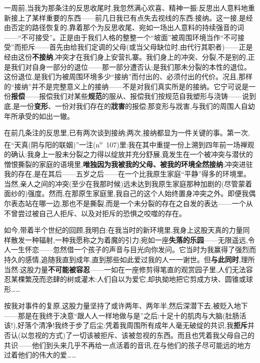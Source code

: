 一周前,当我为那条注的反思收尾时,我忽然满心欢喜、精神一振:反思出人意料地重新接上了某样重要的东西——前几日我已有点失去视线的东西:接纳。这一接,是经由否定的路径恢复的,靠着那个为反思收尾、宛如一场出人意料的持续强音的词——“不可接受”。正是由于我们人格的整整一个“坡面”被周围环境当作“不可接受”而拒斥——首先由给我们定调的父母(或当父母缺位时,由代行其职者)——正是经由这份\textbf{不接纳},冲突才在我们身上安营扎寨。我们身上的冲突、分裂,不是别的,正是我们对自身一部分的退位——那一部分遭否认;是我们那未分裂的本性的退位。这份退位,是我们为被周围环境多少“接纳”而付出的、必须付出的代价。况且,那样的“接纳”并不是完整意义上的接纳——不是对我们真实所是的接纳。它宁可说是一份\textbf{报偿}\dmark{}——报偿我们对某些\textbf{规范}的服从、报偿我们按规范自我塑形与浇铸——说到底,是一份\textbf{变形}、一份对我们存在的\textbf{戕害}的报偿;那变形与戕害,与我们的周围人自幼年所承受的如出一辙。

在前几条注的反思里,已有两次谈到接纳;两次,接纳都显为一件关键的事。第一次,在“天真(阴与阳的联姻)”一注(n\textsuperscript{o}~107)里:我在其中重提一份上溯到四年前一场禅观的确认:我身上一股未分裂之力得以绽放并充分舒展,竟发生在一个被冲突与潜伏的憎恨撕裂的家庭的语境里,\textbf{唯独因为我被我的父母、被我的环境全然接纳};冲突进驻我的存在,是在其后——五岁之后——在一个比我原生家庭“平静”得多的环境里。当然,亲人之间的冲突(至少在我那时候)远未达到我原生家庭那种加剧的(尽管蒙着面纱的)强度。然而,在那原生家庭里,我自己的这个人始终置身冲突之外。即便我偶尔表态站在哪一边,那也不是撕裂,而是一个未分裂的存在之自发的表达——一个从不曾尝过被自己人拒斥、以及对拒斥的恐惧之咬噬的存在。

如今,带着半个世纪的回顾,我明白:在我当时的新环境里,我身上这股天真的力量同样散发一种辐射,一种我愿称之为着魔的引力;宛如一座\textbf{失落的乐园}——无限遥远,令人一生怀恋——忽然借一个孩子的声音与目光向你发问。它当时为我赢得了强烈而持久的感情,追随我直到成年,直到那些如此爱过我的人一一谢世。但\textbf{与此同时},理所当然:这股力量\textbf{不可能被容忍}——一如在一座修剪得笔直的观赏园子里,人们无法容忍某棵繁茂而恣肆的树或灌木:人们自以为爱它,却执拗地把它剪成方块、圆锥或球形……

按我对事件的复原,这股力量坚持了或许两年、两年半,然后深潜下去,\dmark{}被贬入地下——那是在我终于决意“跟人人一样地做与是”之后:十足十的肌肉与大脑(肚肠活该!),好落个清净!我终于步了后尘:凭着我周围所有成年人毫无破绽的共识,我\textbf{拒斥}并否认(以忽视的方式)了一切该被拒斥、该被忽视的东西。而且也凭着我父母自己的共识——他们到头来几乎不再给一点活着的音讯,在与他们的孩子尽可能远的地方过着他们的伟大的爱……

